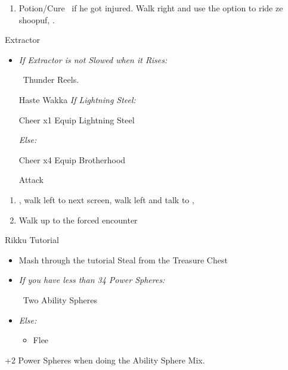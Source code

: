 \begin{enumerate}[resume]
	\item Potion/Cure \tidus\ if he got injured. Walk right and use the  option to ride ze shoopuf, \sd.
\end{enumerate}
\bothvfill\winvfill\lossvfill
\begin{battle}[4000]{Extractor}
	\begin{itemize}
		\tidusf Haste self
		\wakkaf Attack
		\tidusf Attack Extractor until you apply Slow
		\item \textit{If Extractor is not Slowed when it Rises:}
			\begin{itemize}
				\wakkaf \od\ Thunder Reels.
			\end{itemize}
		\tidusf Haste Wakka
		\tidusf \textit{If Lightning Steel:}
			\begin{itemize}
				\tidusf Cheer x1
				\tidusf Equip Lightning Steel
			\end{itemize}
		\textit{Else:}
			\begin{itemize}
				\tidusf Cheer x4
				\tidusf Equip Brotherhood
			\end{itemize}
		\tidusf Attack
	\end{itemize}
\end{battle}
\begin{enumerate}[resume]
	\item \sd, walk left to next screen, walk left and talk to \rikku, \sd
	\item Walk up to the forced encounter
\end{enumerate}
\begin{battle}{Rikku Tutorial}
	\begin{itemize}
		\item Mash through the tutorial
		\rikkuf Steal from the Treasure Chest
		\item \textit{If you have less than 34 Power Spheres:}
		      \begin{itemize}
			      \rikkuf \od\ Two Ability Spheres
		      \end{itemize}
		\item \textit{Else:}
		      \begin{itemize}
			      \rikkuf \od\ Two Potions
				  \rikkuf Defend
				  \item Flee
		      \end{itemize}
	\end{itemize}
+2 Power Spheres when doing the Ability Sphere Mix.
\end{battle}
